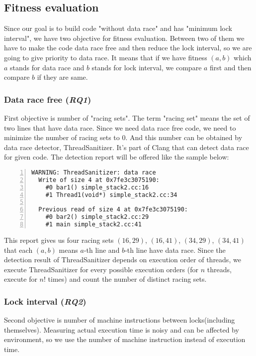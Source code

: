 \subsection{Fitness evaluation}
Since our goal is to build code "without data race" and has "minimum lock interval", we have two objective for fitness evaluation. Between two of them we have to make the code data race free and then reduce the lock interval, so we are going to give priority to data race. It means that if we have fitness $(a, b)$ which $a$ stands for data race and $b$ stands for lock interval, we compare $a$ first and then compare $b$ if they are same.

\subsubsection{Data race free (\textit{RQ1})}
First objective is number of "racing sets". The term "racing set" means the set of two lines that have data race. Since we need data race free code, we need to minimize the number of racing sets to 0. And this number can be obtained by data race detector, ThreadSanitizer. It's part of Clang that can detect data race for given code. The detection report will be offered like the sample below:

\begin{lstlisting}[frame=tb, xleftmargin=2em, framexleftmargin=1.5em, numbers=left]
WARNING: ThreadSanitizer: data race
  Write of size 4 at 0x7fe3c3075190:
    #0 bar1() simple_stack2.cc:16
    #1 Thread1(void*) simple_stack2.cc:34

  Previous read of size 4 at 0x7fe3c3075190:
    #0 bar2() simple_stack2.cc:29
    #1 main simple_stack2.cc:41
\end{lstlisting}

This report gives us four racing sets $(16, 29)$, $(16, 41)$, $(34, 29)$, $(34, 41)$ that each $(a, b)$ means $a$-th line and $b$-th line have data race. Since the detection result of ThreadSanitizer depends on execution order of threads, we execute ThreadSanitizer for every possible execution orders (for $n$ threads, execute for $n!$ times) and count the number of distinct racing sets.
 
\subsubsection{Lock interval (\textit{RQ2})}
Second objective is number of machine instructions between locks(including themselves). Measuring actual execution time is noisy and can be affected by environment, so we use the number of machine instruction instead of execution time.


